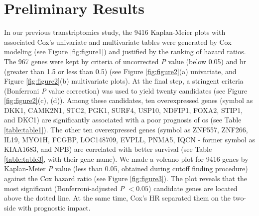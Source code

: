 \documentclass[12pt, a4paper]{article}
\begin{document}
\section*{Preliminary Results}
In our previous transtriptomics study\cite{Chi2020}, %
the 9416 Kaplan-Meier plots with associated Cox's univariate and multivariate tables were generated by Cox modeling (see Figure \ref{fig:figure1}) and justified by the ranking of hazard ratios.
The 967 genes were kept by criteria of uncorrected \textit{P} value (below 0.05) and \acrfull{hr} (greater than 1.5 or less than 0.5) (see Figure \ref{fig:figure2}(a) univariate, and Figure \ref{fig:figure2}(b) multivariate plots). 
At the final step, a stringent criteria (Bonferroni \textit{P} value correction) was used to yield twenty candidates (see Figure \ref{fig:figure2}(c), (d)). 
Among these candidates, ten overexpressed genes (symbol as DKK1, CAMK2N1, STC2, PGK1, SURF4, USP10, NDFIP1, FOXA2, STIP1, and DKC1) are significantly associated with a poor prognosis of  \acrshort{os} (see Table \ref{table:table1}). 
The other ten overexpressed genes (symbol as ZNF557, ZNF266, IL19, MYO1H, FCGBP, LOC148709, EVPLL, PNMA5, IQCN - former symbol as KIAA1683, and NPB) are correlated with better survival (see Table \ref{table:table3}, with their gene name).
We made a volcano plot for 9416 genes by Kaplan-Meier \textit{P} value (less than 0.05, obtained during cutoff finding procedure) against the Cox hazard ratio (see Figure \ref{fig:figure3}). The plot reveals that the most significant (Bonferroni-adjusted \textit{P} $< 0.05$) candidate genes are located above the dotted line. At the same time, Cox's HR separated them on the two-side with prognostic impact.
\end{document}
